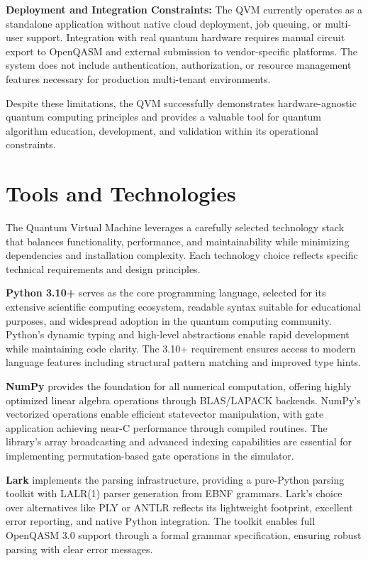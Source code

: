 \textbf{Deployment and Integration Constraints:} The QVM currently operates as a standalone application without native cloud deployment, job queuing, or multi-user support. Integration with real quantum hardware requires manual circuit export to OpenQASM and external submission to vendor-specific platforms. The system does not include authentication, authorization, or resource management features necessary for production multi-tenant environments.

Despite these limitations, the QVM successfully demonstrates hardware-agnostic quantum computing principles and provides a valuable tool for quantum algorithm education, development, and validation within its operational constraints.




\section{Tools and Technologies}

The Quantum Virtual Machine leverages a carefully selected technology stack that balances functionality, performance, and maintainability while minimizing dependencies and installation complexity. Each technology choice reflects specific technical requirements and design principles.

\textbf{Python 3.10+} serves as the core programming language, selected for its extensive scientific computing ecosystem, readable syntax suitable for educational purposes, and widespread adoption in the quantum computing community. Python's dynamic typing and high-level abstractions enable rapid development while maintaining code clarity. The 3.10+ requirement ensures access to modern language features including structural pattern matching and improved type hints.

\textbf{NumPy} provides the foundation for all numerical computation, offering highly optimized linear algebra operations through BLAS/LAPACK backends. NumPy's vectorized operations enable efficient statevector manipulation, with gate application achieving near-C performance through compiled routines. The library's array broadcasting and advanced indexing capabilities are essential for implementing permutation-based gate operations in the simulator.

\textbf{Lark} implements the parsing infrastructure, providing a pure-Python parsing toolkit with LALR(1) parser generation from EBNF grammars. Lark's choice over alternatives like PLY or ANTLR reflects its lightweight footprint, excellent error reporting, and native Python integration. The toolkit enables full OpenQASM 3.0 support through a formal grammar specification, ensuring robust parsing with clear error messages.

